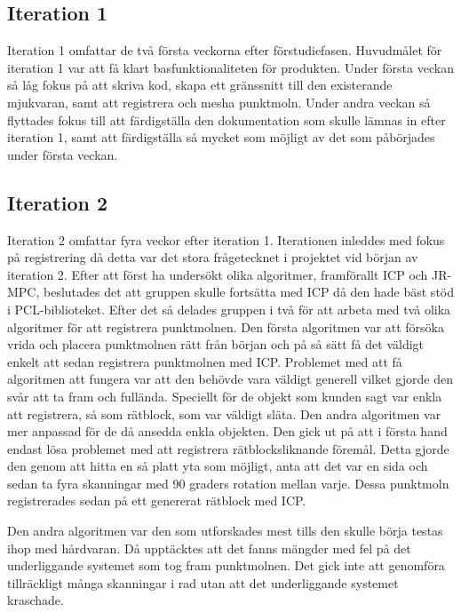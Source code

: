 \subsection{Iteration 1}

Iteration 1 omfattar de två första veckorna efter förstudiefasen. Huvudmålet för iteration 1 var att få klart basfunktionaliteten för produkten. Under första veckan så låg fokus på att skriva kod, skapa ett gränssnitt till den existerande mjukvaran, samt att registrera och mesha punktmoln. Under andra veckan så flyttades fokus till att färdigställa den dokumentation som skulle lämnas in efter iteration 1, samt att färdigställa så mycket som möjligt av det som påbörjades under första veckan.

\subsection{Iteration 2}

Iteration 2 omfattar fyra veckor efter iteration 1. Iterationen inleddes med fokus på registrering då detta var det stora frågetecknet i projektet vid början av iteration 2. Efter att först ha undersökt olika algoritmer, framförallt ICP och JR-MPC, beslutades det att gruppen skulle fortsätta med ICP då den hade bäst stöd i PCL-biblioteket. Efter det så delades gruppen i två för att arbeta med två olika algoritmer för att registrera punktmolnen. Den första algoritmen var att försöka vrida och placera punktmolnen rätt från början och på så sätt få det väldigt enkelt att sedan registrera punktmolnen med ICP. Problemet med att få algoritmen att fungera var att den behövde vara väldigt generell vilket gjorde den svår att ta fram och fullända. Speciellt för de objekt som kunden sagt var enkla att registrera, så som rätblock, som var väldigt släta. Den andra algoritmen var mer anpassad för de då ansedda enkla objekten. Den gick ut på att i första hand endast lösa problemet med att registrera rätblocksliknande föremål. Detta gjorde den genom att hitta en så platt yta som möjligt, anta att det var en sida och sedan ta fyra skanningar med 90 graders rotation mellan varje. Dessa punktmoln registrerades sedan på ett genererat rätblock med ICP.

Den andra algoritmen var den som utforskades mest tills den skulle börja testas ihop med hårdvaran. Då upptäcktes att det fanns mängder med fel på det underliggande systemet som tog fram punktmolnen. Det gick inte att genomföra tillräckligt många skanningar i rad utan att det underliggande systemet kraschade.

